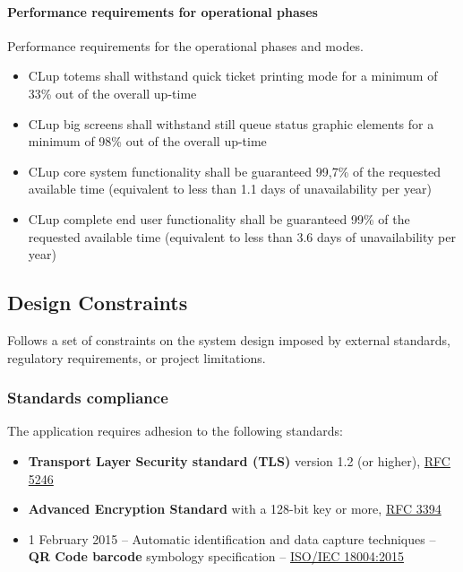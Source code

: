 \paragraph{Performance requirements for operational phases}
\label{par:operationalPhases}
Performance requirements for the operational phases and modes.\newline
\begin{itemize}[leftmargin=+.8in]
    \item [\ref{par:operationalPhases}.3.1] CLup totems shall withstand quick ticket printing mode for a minimum of 33\% out of the overall up-time
    \item [\ref{par:operationalPhases}.3.2] CLup big screens shall withstand still queue status graphic elements for a minimum of 98\% out of the overall up-time
    \item [\ref{par:operationalPhases}.3.3] CLup core system functionality shall be guaranteed 99,7\% of the requested available time (equivalent to less than 1.1 days of unavailability per year)
    \item [\ref{par:operationalPhases}.3.4] CLup complete end user functionality shall be guaranteed 99\% of the requested available time (equivalent to less than 3.6 days of unavailability per year)
\end{itemize}

\subsection{Design Constraints}
Follows a set of constraints on the system design imposed by external standards, regulatory requirements, or project
limitations.

\subsubsection{Standards compliance}
\label{standards}
The application requires adhesion to the following standards:\newline 
\begin{itemize}
    \item \textbf{Transport Layer Security standard (TLS)} version 1.2 (or higher), \href{https://tools.ietf.org/html/rfc5246}{RFC 5246}
    \item \textbf{Advanced Encryption Standard} with a 128-bit key or more, \href{https://tools.ietf.org/html/rfc3394}{RFC 3394}
    \item 1 February 2015 – Automatic identification and data capture techniques – \textbf{QR Code barcode} symbology specification – \href{http://www.iso.org/iso/catalogue_detail.htm?csnumber=62021}{ISO/IEC 18004:2015}
\end{itemize}

